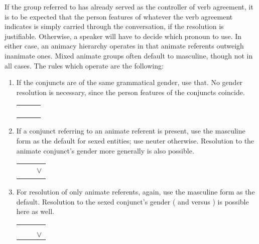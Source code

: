 If the group referred to has already served as the controller of verb
agreement, it is to be expected that the person features of whatever the verb
agreement indicates is simply carried through the conversation, if the
resolution is justifiable. Otherwise, a speaker will have to decide which
pronoun to use. In either case, an animacy hierarchy operates in that animate
referents outweigh inanimate ones. Mixed animate groups often default to
masculine, though not in all cases. The rules which operate are the following:

\begin{enumerate}
\item If the conjuncts are of the same grammatical gender, use that. No
gender resolution is necessary, since the person features of the conjuncts
coincide.

	\quad%
	\begin{tabular}[t]{@{} c @{ $\cup$ } c @{ $\implies$ } c}
	\M{} & \M{} & \M{} \\
	\F{} & \F{} & \F{} \\
	\N{} & \N{} & \N{} \\
	\Inan{} & \Inan{} & \Inan{} \\
	\end{tabular}

\item If a conjunct referring to an animate referent is present, use the
masculine form as the default for sexed entities; use neuter otherwise.
Resolution to the animate conjunct's gender more generally is also possible.

	\quad%
	\begin{tabular}[t]{@{} c @{ $\cup$ } c @{ $\implies$ } c}
	\M{} & \Inan{} & \M{} \\
	\F{} & \Inan{} & \M{} $\lor$ \F{} \\
	\N{} & \Inan{} & \N{} \\
	\end{tabular}

\item For resolution of only animate referents, again, use the masculine form
as the default. Resolution to the sexed conjunct's gender (\M{} and \F{} versus
\N{}) is possible here as well.

	\quad%
	\begin{tabular}[t]{@{} c @{ $\cup$ } c @{ $\implies$ } c}
	\M{} & \F{} & \M{} \\
	\M{} & \N{} & \M{} \\
	\F{} & \N{} & \M{} $\lor$ \F{} \\
	\end{tabular}

\end{enumerate}

